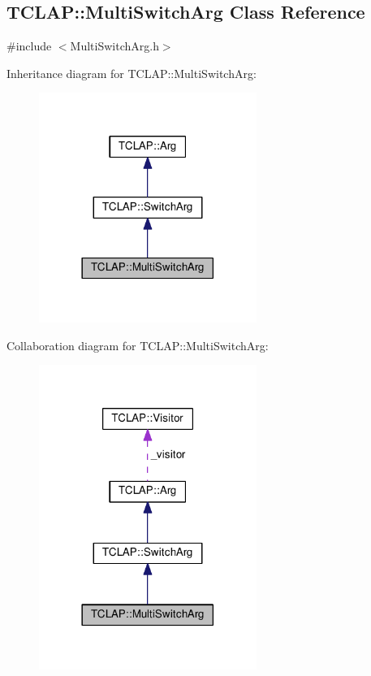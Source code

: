 \hypertarget{classTCLAP_1_1MultiSwitchArg}{}\subsection{T\+C\+L\+AP\+:\+:Multi\+Switch\+Arg Class Reference}
\label{classTCLAP_1_1MultiSwitchArg}


{\ttfamily \#include $<$Multi\+Switch\+Arg.\+h$>$}



Inheritance diagram for T\+C\+L\+AP\+:\+:Multi\+Switch\+Arg\+:
\nopagebreak
\begin{figure}[H]
\begin{center}
\leavevmode
\includegraphics[width=201pt]{classTCLAP_1_1MultiSwitchArg__inherit__graph}
\end{center}
\end{figure}


Collaboration diagram for T\+C\+L\+AP\+:\+:Multi\+Switch\+Arg\+:
\nopagebreak
\begin{figure}[H]
\begin{center}
\leavevmode
\includegraphics[width=201pt]{classTCLAP_1_1MultiSwitchArg__coll__graph}
\end{center}
\end{figure}
